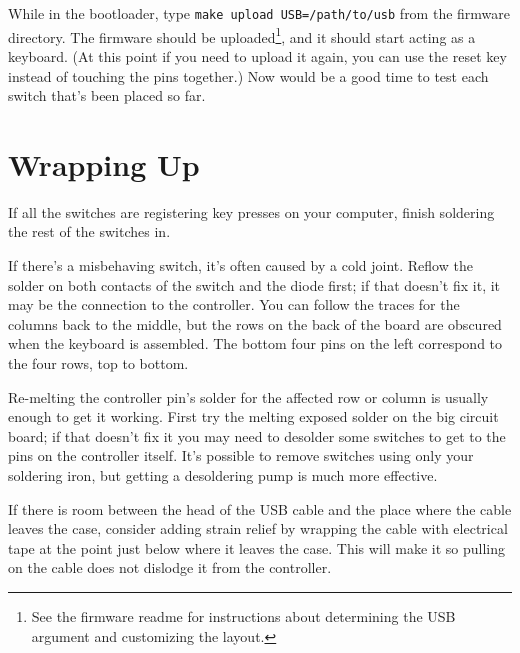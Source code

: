 \documentclass{article}
\begin{document}
\vspace{1em}

While in the bootloader, type \texttt{make upload USB=/path/to/usb}
from the firmware directory. The firmware should be
uploaded\footnote{See the firmware readme for instructions about
  determining the USB argument and customizing the layout.}, and it
should start acting as a keyboard. (At this point if you need to
upload it again, you can use the reset key instead of touching the
pins together.) Now would be a good time to test each switch that's
been placed so far.

\section{Wrapping Up}

If all the switches are registering key presses on your computer,
finish soldering the rest of the switches in.

\vspace{1em}

If there's a misbehaving switch, it's often caused by a cold
joint. Reflow the solder on both contacts of the switch and the diode
first; if that doesn't fix it, it may be the connection to the
controller. You can follow the traces for the columns back to the
middle, but the rows on the back of the board are obscured when the
keyboard is assembled. The bottom four pins on the left correspond to
the four rows, top to bottom.

\vspace{1em}

Re-melting the controller pin's solder for the affected row or column
is usually enough to get it working. First try the melting exposed
solder on the big circuit board; if that doesn't fix it you may need
to desolder some switches to get to the pins on the controller
itself. It's possible to remove switches using only your soldering
iron, but getting a desoldering pump is much more effective.

\vspace{1em}

If there is room between the head of the USB cable and the place where
the cable leaves the case, consider adding strain relief by wrapping
the cable with electrical tape at the point just below where it leaves
the case. This will make it so pulling on the cable does not dislodge
it from the controller.

\vspace{1em}
\end{document}
